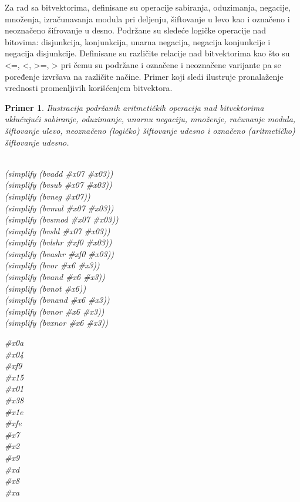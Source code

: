 \documentclass[12pt,oneside]{memoir}
\newtheorem{primer}{Primer}
\begin{document}
Za rad sa bitvektorima, definisane su operacije sabiranja, oduzimanja, negacije, množenja, izračunavanja modula pri deljenju, šiftovanje u levo kao i označeno i neoznačeno šifrovanje u desno. Podržane su sledeće logičke operacije nad bitovima: disjunkcija, konjunkcija, unarna negacija, negacija konjunkcije i negacija disjunkcije. Definisane su različite relacije nad bitvektorima kao što su <=, <, >=, > pri čemu su podržane i označene i neoznačene varijante pa se poređenje izvršava na različite načine. Primer koji sledi ilustruje pronalaženje vrednosti promenljivih korišćenjem bitvektora. 


\begin{primer} Ilustracija podržanih aritmetičkih operacija nad bitvektorima uklučujući sabiranje, oduzimanje, unarnu negaciju, množenje, računanje modula, šiftovanje ulevo, neoznačeno (logičko) šiftovanje udesno i označeno (aritmetičko) šiftovanje udesno.
\\\\
\begin{minipage}[b]{0.5\textwidth}
(simplify (bvadd \#x07 \#x03)) 
\\(simplify (bvsub \#x07 \#x03))
\\(simplify (bvneg \#x07)) 
\\(simplify (bvmul \#x07 \#x03)) 
\\(simplify (bvsmod \#x07 \#x03)) 
\\(simplify (bvshl \#x07 \#x03)) 
\\(simplify (bvlshr \#xf0 \#x03)) 
\\(simplify (bvashr \#xf0 \#x03)) 
\\(simplify (bvor \#x6 \#x3)) 
\\(simplify (bvand \#x6 \#x3))  
\\(simplify (bvnot \#x6)) 
\\(simplify (bvnand \#x6 \#x3)) 
\\(simplify (bvnor \#x6 \#x3)) 
\\(simplify (bvxnor \#x6 \#x3)) 

\end{minipage}
\hspace{1.5cm}
\begin{minipage}[b]{0.5\textwidth}
\#x0a 
\\\#x04 
\\\#xf9 
\\\#x15 
\\\#x01 
\\\#x38 
\\\#x1e 
\\\#xfe
\\\#x7 
\\\#x2 
\\\#x9 
\\\#xd 
\\\#x8 
\\\#xa
\end{minipage}

\end{primer}
\end{document}
